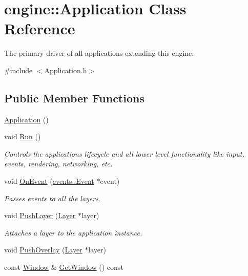 \hypertarget{classengine_1_1Application}{}\section{engine\+:\+:Application Class Reference}
\label{classengine_1_1Application}


The primary driver of all applications extending this engine.  




{\ttfamily \#include $<$Application.\+h$>$}

\subsection*{Public Member Functions}
\begin{DoxyCompactItemize}
\item 
\hyperlink{classengine_1_1Application_a9740cd2e55318cbc5684a6c4c2f3304f}{Application} ()
\item 
void \hyperlink{classengine_1_1Application_a4dcdf08d920f7f63013a25cb1e80438b}{Run} ()
\begin{DoxyCompactList}\small\item\em Controls the applications lifecycle and all lower level functionality like input, events, rendering, networking, etc. \end{DoxyCompactList}\item 
void \hyperlink{classengine_1_1Application_a093e14152fc1eda1b5eba682a2b4afd9}{On\+Event} (\hyperlink{classengine_1_1events_1_1Event}{events\+::\+Event} $\ast$event)
\begin{DoxyCompactList}\small\item\em Passes events to all the layers. \end{DoxyCompactList}\item 
void \hyperlink{classengine_1_1Application_adb129a86a6cdbd80b25094d08605d213}{Push\+Layer} (\hyperlink{classengine_1_1Layer}{Layer} $\ast$layer)
\begin{DoxyCompactList}\small\item\em Attaches a layer to the application instance. \end{DoxyCompactList}\item 
void \hyperlink{classengine_1_1Application_a00041c455b5699665d21662be95abd85}{Push\+Overlay} (\hyperlink{classengine_1_1Layer}{Layer} $\ast$layer)
\item 
const \hyperlink{classengine_1_1Window}{Window} \& \hyperlink{classengine_1_1Application_a0c66a3ff294bcc497bb2e8eb7330124c}{Get\+Window} () const
\end{DoxyCompactItemize}
